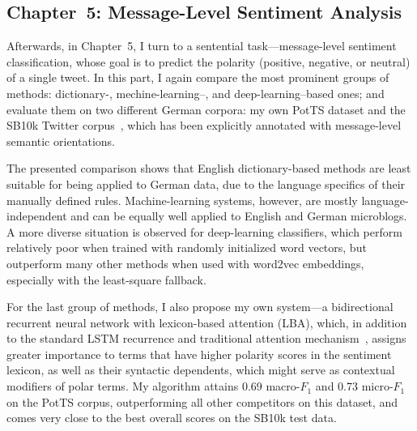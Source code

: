 \documentclass[11pt]{article}
\newcommand{\F}[0]{$F_1$}
\renewcommand{\cite}{\citep}
\begin{document}

\subsection{Chapter~5: Message-Level Sentiment Analysis}

Afterwards, in Chapter~5, I turn to a sentential task---message-level
sentiment classification, whose goal is to predict the polarity
(positive, negative, or neutral) of a single tweet.  In this part, I
again compare the most prominent groups of methods: dictionary-,
mechine-learning--, and deep-learning--based ones; and evaluate them
on two different German corpora: my own PotTS dataset and the SB10k
Twitter corpus~\cite{Cieliebak:17}, which has been explicitly
annotated with message-level semantic orientations.

The presented comparison shows that English dictionary-based methods
are least suitable for being applied to German data, due to the
language specifics of their manually defined rules.  Machine-learning
systems, however, are mostly language-independent and can be equally
well applied to English and German microblogs.  A more diverse
situation is observed for deep-learning classifiers, which perform
relatively poor when trained with randomly initialized word vectors,
but outperform many other methods when used with word2vec embeddings,
especially with the least-square fallback.

For the last group of methods, I also propose my own system---a
bidirectional recurrent neural network with lexicon-based attention
(LBA), which, in addition to the standard LSTM recurrence and
traditional attention mechanism~\cite{Bahdanau:14}, assigns greater
importance to terms that have higher polarity scores in the sentiment
lexicon, as well as their syntactic dependents, which might serve as
contextual modifiers of polar terms.  My algorithm attains 0.69
macro-\F{} and 0.73 micro-\F{} on the PotTS corpus, outperforming all
other competitors on this dataset, and comes very close to the best
overall scores on the SB10k test data.
\end{document}
